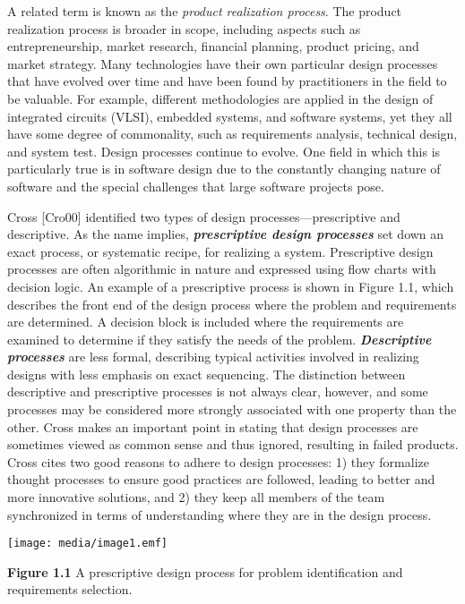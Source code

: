 A related term is known as the \emph{product realization process}. The
product realization process is broader in scope, including aspects such
as entrepreneurship, market research, financial planning, product
pricing, and market strategy. Many technologies have their own
particular design processes that have evolved over time and have been
found by practitioners in the field to be valuable. For example,
different methodologies are applied in the design of integrated circuits
(VLSI), embedded systems, and software systems, yet they all have some
degree of commonality, such as requirements analysis, technical design,
and system test. Design processes continue to evolve. One field in which
this is particularly true is in software design due to the constantly
changing nature of software and the special challenges that large
software projects pose.

Cross {[}Cro00{]} identified two types of design
processes---prescriptive and descriptive. As the name implies,
\emph{\textbf{prescriptive design processes}} set down an exact process,
or systematic recipe, for realizing a system. Prescriptive design
processes are often algorithmic in nature and expressed using flow
charts with decision logic. An example of a prescriptive process is
shown in Figure 1.1, which describes the front end of the design process
where the problem and requirements are determined. A decision block is
included where the requirements are examined to determine if they
satisfy the needs of the problem. \emph{\textbf{Descriptive processes}}
are less formal, describing typical activities involved in realizing
designs with less emphasis on exact sequencing. The distinction between
descriptive and prescriptive processes is not always clear, however, and
some processes may be considered more strongly associated with one
property than the other. Cross makes an important point in stating that
design processes are sometimes viewed as common sense and thus ignored,
resulting in failed products. Cross cites two good reasons to adhere to
design processes: 1) they formalize thought processes to ensure good
practices are followed, leading to better and more innovative solutions,
and 2) they keep all members of the team synchronized in terms of
understanding where they are in the design process.

\texttt{[image: media/image1.emf]}

\textbf{Figure 1.1} A prescriptive design process for problem
identification and requirements selection.

